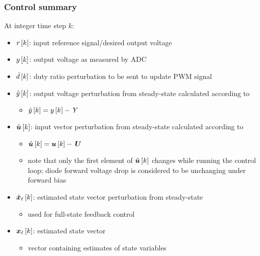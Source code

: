 \subsubsection{Control summary}
At integer time step $k$:
\begin{itemize}
\item $r\left[k\right]$: input reference signal/desired output voltage
\item $y\left[k\right]$: output voltage as measured by ADC
\item $\hat{d}\left[k\right]$: duty ratio perturbation to be sent to update PWM signal
\item $\hat{y}\left[k\right]$: output voltage perturbation from steady-state calculated according to
    \begin{itemize}
    \item $\hat{y}\left[k\right] = y\left[k\right] - \, Y$
    \end{itemize}
\item $\hat{\boldsymbol{u}}\left[k\right]$: input vector perturbation from steady-state calculated according to
    \begin{itemize}
    \item $\hat{\boldsymbol{u}}\left[k\right] = \boldsymbol{u}\left[k\right] - \, \boldsymbol{U}$
    \item note that only the first element of $\hat{\boldsymbol{u}}\left[k\right]$ changes while running the control loop; diode forward voltage drop is considered to be unchanging under forward bias
    \end{itemize}
\item $\hat{\boldsymbol{x}}_\ell\left[k\right]$: estimated state vector perturbation from steady-state
    \begin{itemize}
    \item used for full-state feedback control
    \end{itemize}
\item $\boldsymbol{x}_\ell\left[k\right]$: estimated state vector
    \begin{itemize}
    \item vector containing estimates of state variables
    \end{itemize}
\end{itemize}
\iffalse
